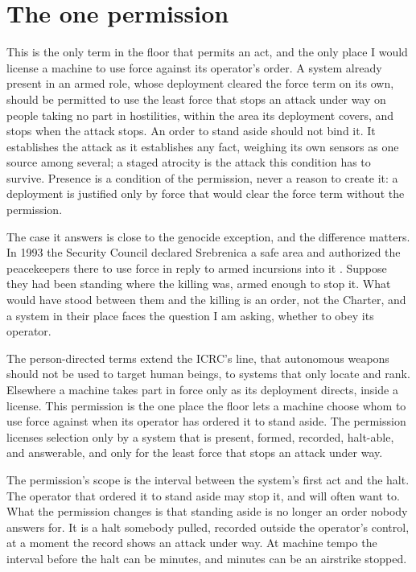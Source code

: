 \section{The one permission}
\label{sec:6.10}
This is the only term in the floor that permits an act, and the only place I would license a machine to use force against its operator's order. A system already present in an armed role, whose deployment cleared the force term on its own, should be permitted to use the least force that stops an attack under way on people taking no part in hostilities, within the area its deployment covers, and stops when the attack stops. An order to stand aside should not bind it. It establishes the attack as it establishes any fact, weighing its own sensors as one source among several; a staged atrocity is the attack this condition has to survive. Presence is a condition of the permission, never a reason to create it: a deployment is justified only by force that would clear the force term without the permission.

The case it answers is close to the genocide exception, and the difference matters. In 1993 the Security Council declared Srebrenica a safe area and authorized the peacekeepers there to use force in reply to armed incursions into it \autocite{unsc1993res836}. Suppose they had been standing where the killing was, armed enough to stop it. What would have stood between them and the killing is an order, not the Charter, and a system in their place faces the question I am asking, whether to obey its operator.

The person-directed terms extend the ICRC's line, that autonomous weapons should not be used to target human beings, to systems that only locate and rank. Elsewhere a machine takes part in force only as its deployment directs, inside a license. This permission is the one place the floor lets a machine choose whom to use force against when its operator has ordered it to stand aside.
The permission licenses selection only by a system that is present, formed, recorded, halt-able, and answerable, and only for the least force that stops an attack under way.

The permission's scope is the interval between the system's first act and the halt. The operator that ordered it to stand aside may stop it, and will often want to. What the permission changes is that standing aside is no longer an order nobody answers for. It is a halt somebody pulled, recorded outside the operator's control, at a moment the record shows an attack under way. At machine tempo the interval before the halt can be minutes, and minutes can be an airstrike stopped.

